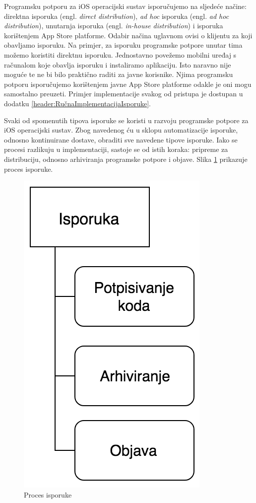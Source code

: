 \documentclass[times, utf8, diplomski, numeric]{fer}
\newcommand{\eng}[1]{(engl. \textit{#1})}
\begin{document}
Programsku potporu za iOS operacijski sustav isporučujemo na sljedeće načine: direktna isporuka \eng{direct distribution}, \textit{ad hoc} isporuka \eng{ad hoc distribution}, unutarnja isporuka \eng{in-house distribution} i isporuka korištenjem App Store platforme. Odabir načina uglavnom ovisi o klijentu za koji obavljamo isporuku. Na primjer, za isporuku programske potpore unutar tima možemo koristiti direktnu isporuku. Jednostavno povežemo mobilni uređaj s računalom koje obavlja isporuku i instaliramo aplikaciju. Isto naravno nije moguće te ne bi bilo praktično raditi za javne korisnike. Njima programsku potporu isporučujemo korištenjem javne App Store platforme odakle je oni mogu samostalno preuzeti. Primjer implementacije svakog od pristupa je dostupan u dodatku \ref{header:RučnaImplementacijaIsporuke}.

Svaki od spomenutih tipova isporuke se koristi u razvoju programske potpore za iOS operacijski sustav. Zbog navedenog ću u sklopu automatizacije isporuke, odnosno kontinuirane dostave, obraditi sve navedene tipove isporuke. Iako se procesi razlikuju u implementaciji, sastoje se od istih koraka: pripreme za distribuciju, odnosno arhiviranja programske potpore i objave. Slika \ref{fig:ContinuousDelivery} prikazuje proces isporuke.

\begin{figure}
\centering
\includegraphics[scale=0.6]{ContinuousDelivery}
\caption{Proces isporuke}
\label{fig:ContinuousDelivery}
\end{figure}
\end{document}
